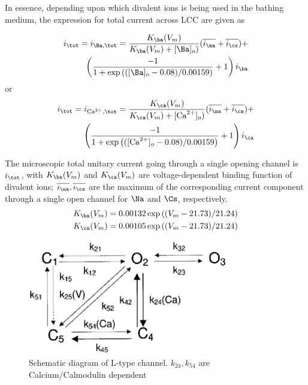 In essence, depending upon which divalent ions is being used in the bathing
medium, the expression for total current across LCC are given as

\begin{equation}
\begin{split}
i_\tot = i_{\Ba,\tot} = \frac{K_\ba(V_m)}{K_\ba(V_m)+[\Ba]_o)} (\overline{i_\na} +
\overline{i_\cs}) + \\
\left( \frac{-1}{1+ \exp\left( ([\Ba]_o - 0.08)/0.00159 \right)} +1 \right)
i_\ba
\end{split}
\end{equation}
or
\begin{equation}
\begin{split}
i_\tot = i_{\Ca,\tot} = \frac{K_\ca(V_m)}{K_\ca(V_m)+[\Ca]_o)} (\overline{i_\na} +
\overline{i_\cs}) +
\\
\left( \frac{-1}{1+ \exp\left( ([\Ca]_o - 0.08)/0.00159 \right)} +1 \right)
i_\ca
\end{split}
\end{equation}

The microscopic total unitary current going through a single opening channel is
$i_\tot$, with $K_\ba(V_m)$ and $K_\ca(V_m)$ are voltage-dependent binding
function of divalent ions; $\overline{i_\na}, \overline{i_\cs}$ are the maximum of the
corresponding current component through a single open channel for $\Na$ and
$\Cs$, respectively.
\begin{eqnarray}
K_\ba(V_m) = 0.00132\exp\left( (V_m-21.73)/21.24 \right) \\
K_\ca(V_m) = 0.00105\exp\left( (V_m-21.73)/21.24 \right) 
\end{eqnarray}

\begin{figure}[hbt]
 \centerline{\includegraphics[height=5cm, angle=0]{./images/Sun_DHPR.eps}}
\caption{Schematic diagram of L-type channel. $k_{24}, k_{54}$ are
Calcium/Calmodulin dependent}
\label{fig:Sun_DHPR}
\end{figure}


